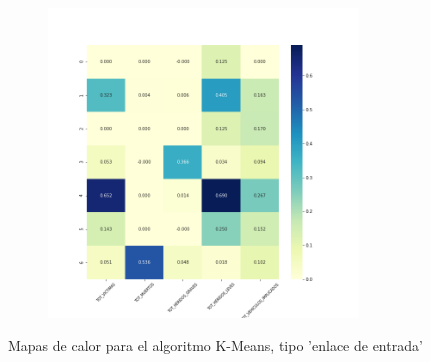 \begin{figure}[H]
\begin{subfigure}{.5\textwidth}
\end{subfigure}
\begin{subfigure}{.5\textwidth}
  \centering
  \includegraphics[width=0.9\textwidth]{imagenes/case1/kmeans/heatmaps/hm_kmeans_case1_entrada_k7.png}
\end{subfigure}
\caption{Mapas de calor para el algoritmo K-Means, tipo 'enlace de entrada'}
\label{fig:hm-km}
\end{figure}

